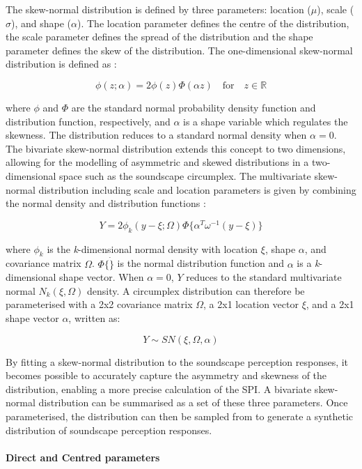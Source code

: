 \documentclass[
  authoryear,
  preprint,
  3p]{elsarticle}
\let\oldparagraph\paragraph
\renewcommand{\paragraph}[1]{\oldparagraph{#1}\mbox{}}
\begin{document}
The skew-normal distribution is defined by three parameters: location
(\(\mu\)), scale (\(\sigma\)), and shape (\(\alpha\)). The location
parameter defines the centre of the distribution, the scale parameter
defines the spread of the distribution and the shape parameter defines
the skew of the distribution. The one-dimensional skew-normal
distribution is defined as \citet{Azzalini1996Multivariate}:

\[
\phi(z; \alpha) = 2 \phi(z) \Phi(\alpha z) \quad \text{for} \quad z \in \mathbb{R}
\]

where \(\phi\) and \(\Phi\) are the standard normal probability density
function and distribution function, respectively, and \(\alpha\) is a
shape variable which regulates the skewness. The distribution reduces to
a standard normal density when \(\alpha = 0\). The bivariate skew-normal
distribution extends this concept to two dimensions, allowing for the
modelling of asymmetric and skewed distributions in a two-dimensional
space such as the soundscape circumplex. The multivariate skew-normal
distribution including scale and location parameters is given by
combining the normal density and distribution functions
\citep{Azzalini1999Statistical}:

\[
Y = 2 \phi_k (y-\xi; \Omega) \Phi\{\alpha^T\omega^{-1}(y-\xi)\} 
\]

where \(\phi_k\) is the \emph{k}-dimensional normal density with
location \(\xi\), shape \(\alpha\), and covariance matrix \(\Omega\).
\(\Phi \{ \dot \}\) is the normal distribution function and \(\alpha\)
is a \emph{k}-dimensional shape vector. When \(\alpha = 0\), \(Y\)
reduces to the standard multivariate normal \(N_k(\xi, \Omega)\)
density. A circumplex distribution can therefore be parameterised with a
2x2 covariance matrix \(\Omega\), a 2x1 location vector \(\xi\), and a
2x1 shape vector \(\alpha\), written as:

\[
Y \sim SN (\xi, \Omega, \alpha)
\]

By fitting a skew-normal distribution to the soundscape perception
responses, it becomes possible to accurately capture the asymmetry and
skewness of the distribution, enabling a more precise calculation of the
SPI. A bivariate skew-normal distribution can be summarised as a set of
these three parameters. Once parameterised, the distribution can then be
sampled from to generate a synthetic distribution of soundscape
perception responses.

\paragraph{Direct and Centred
parameters}\label{direct-and-centred-parameters}
\end{document}
